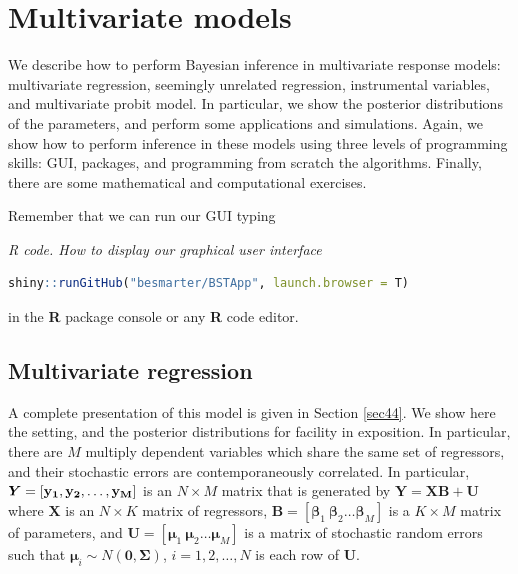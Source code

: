 \chapter{Multivariate models}\label{chap7}

We describe how to perform Bayesian inference in multivariate response models: multivariate regression, seemingly unrelated regression, instrumental variables, and multivariate probit model. In particular, we show the posterior distributions of the parameters, and perform some applications and simulations. Again, we show how to perform inference in these models using three levels of programming skills: GUI, packages, and programming from scratch the algorithms. Finally, there are some mathematical and computational exercises.

Remember that we can run our GUI typing

\begin{tcolorbox}[enhanced,width=4.67in,center upper,
	fontupper=\large\bfseries,drop shadow southwest,sharp corners]
	\textit{R code. How to display our graphical user interface}
	\begin{VF}
		\begin{lstlisting}[language=R]
	shiny::runGitHub("besmarter/BSTApp", launch.browser = T)
\end{lstlisting}
	\end{VF}
\end{tcolorbox} 

in the \textbf{R} package console or any \textbf{R} code editor.

\section{Multivariate regression}\label{sec71}

A complete presentation of this model is given in Section \ref{sec44}. We show here the setting, and the posterior distributions for facility in exposition. In particular, there are $M$ multiply dependent variables which share the same set of regressors, and their stochastic errors are contemporaneously correlated. In particular, $\bm{Y}=\left[{\bf{y_{1}}},{\bf{y_{2}}},\ldots,{\bf{y_{M}}}\right]$ is an $ N\times M$ matrix that is generated by $\bm{Y}=\bm{X}\bm{B}+\bm{U}$ where $\bm{X}$ is an $ N\times K$ matrix of regressors, $\bm{B}=\left[\bm{\beta}_{1} \ \bm{\beta}_{2} \ldots \bm{\beta}_{M}\right]$ is a $ K\times M$ matrix of parameters, and $\bm{U}=\left[\bm{\mu}_{1} \ \bm{\mu}_{2}\ldots \bm{\mu}_{M}\right]$ is a matrix of stochastic random errors such that $\bm{\mu}_i\sim{N}(\bm{0},\bm{\Sigma})$, $i=1,2,\dots,N$ is each row of $\bm{U}$.

